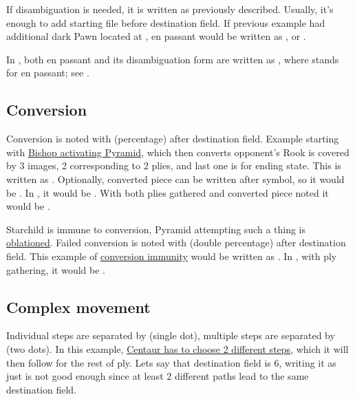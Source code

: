 If disambiguation is needed, it is written as previously described. Usually, it's enough to
add starting file before destination field. If previous example had additional dark Pawn
located at , en passant would be written as , or .

In , both en passant and its disambiguation form are written as
, where  stands for en passant; see .

\subsection*{Conversion}
\label{sec:Appendix/Notation/Conversion}

Conversion is noted with \alg{\%} (percentage) after destination field. Example starting
with \hyperref[fig:scn_ma_08_conversion_init]{Bishop activating Pyramid}, which then converts
opponent's Rook is covered by 3 images, 2 corresponding to 2 plies, and last one is for ending
state. This is written as . Optionally, converted piece can be written after
\alg{\%} symbol, so it would be . In , it would be
. With both plies gathered and converted piece noted it would be
\alg{[Bh9-d5]\~{}[Ad5-h5\%R]}.

Starchild is immune to conversion, Pyramid attempting such a thing is
\hyperref[sec:Terms/Oblation]{oblationed}. Failed conversion is noted with \alg{\%\%}
(double percentage) after destination field. This example of
\hyperref[fig:scn_o_14_starchild_conversion_immunity_init]{conversion immunity} would be
written as . In , with ply gathering, it would be
\alg{[Bs16-l23]\~{}[Al23-h23\%\%]}.

\subsection*{Complex movement}
\label{sec:Appendix/Notation/Complex movement}

Individual steps are separated by  (single dot), multiple steps are separated by
 (two dots). In this example,
\hyperref[fig:scn_hd_05_centaur_multi_step]{Centaur has to choose 2 different steps},
which it will then follow for the rest of ply. Lets say that destination field is 6,
writing it as just  is not good enough since at least 2 different paths lead
to the same destination field.

